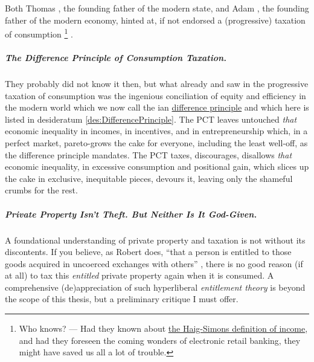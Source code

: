 Both Thomas \citeauthor{Hobbes-1651-aa}, the founding father of the modern state, and Adam \citeauthor{Smith-1776-lq}, the founding father of the modern economy, hinted at, if not endorsed a (progressive) taxation of consumption
\footnote{
	Who knows?
	--- Had they known about \hyperref[eq:HaigSimonsPCT]{the Haig-Simons definition of income}, and had they foreseen the coming wonders of electronic retail banking, they might have saved us all a lot of trouble.
}
.

\subparagraph{The Difference Principle of Consumption Taxation.} They probably did not know it then, but what already \citeauthor{Hobbes-1651-aa} and \citeauthor{Smith-1776-lq} saw in the progressive taxation of consumption was the ingenious conciliation of equity and efficiency in the modern world which we now call the \citeauthor{Rawls-1971}ian \hyperref[des:DifferencePrinciple]{difference principle} and which here is listed in desideratum \ref{des:DifferencePrinciple}.
The PCT leaves untouched \emph{that} economic inequality in incomes, in incentives, and in entrepreneurship which, in a perfect market, pareto-grows the cake for everyone, including the least well-off, as the difference principle mandates.
The PCT taxes, discourages, disallows \emph{that} economic inequality, in excessive consumption and positional gain, which slices up the cake in exclusive, inequitable pieces, devours it, leaving only the shameful crumbs for the rest.

\subparagraph{Private Property Isn't Theft.
But Neither Is It God-Given.}  \label{sec:AntiEntitlement} A foundational understanding of private property and taxation is not without its discontents.
If you believe, as Robert \citeauthor{Nozick1974} does, ``that a person is entitled to those goods acquired in uncoerced exchanges with others'' \citeyearpar[149]{Nozick1974}, there is no good reason (if at all) to tax this \emph{entitled} private property again when it is consumed.
A comprehensive (de)appreciation of such hyperliberal \emph{entitlement theory} is beyond the scope of this thesis, but a preliminary critique I must offer.

